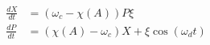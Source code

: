 \documentclass{amsart}
\begin{document}
  \begin{align}
    \frac{dX}{dt} &= ( \omega_c - \chi (A) ) P \xi\\
    \frac{dP}{dt} &= ( \chi(A) - \omega_c ) X + \xi \cos ( \omega_d t )
  \end{align}
\end{document}
